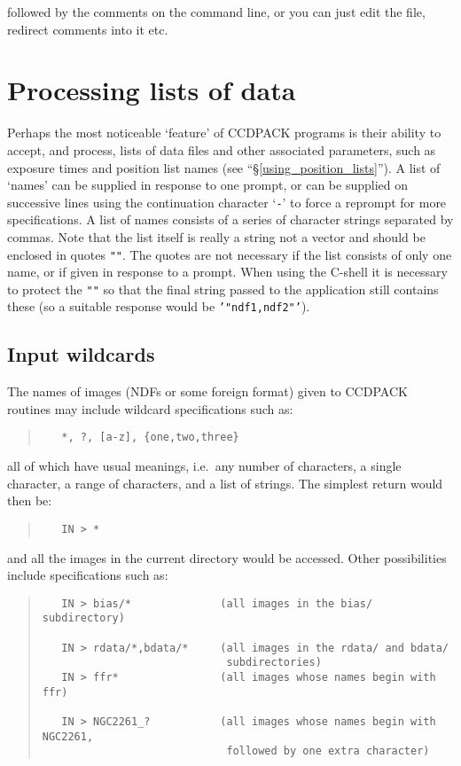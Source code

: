\documentclass[twoside,11pt]{article}
\newcommand{\hyperref}[4]{#2\ref{#4}#3}
\newcommand{\latexhtml}[2]{#1}
\newcommand{\xlabel}[1]{}
\renewcommand{\_}{\texttt{\symbol{95}}}
\newcommand{\ttsize}{\latexhtml{\small}{}}
\newenvironment{myquote}{\begin{quote}\ttsize}{\end{quote}}
\newcommand{\text}[1]{{\ttsize \tt #1}}
\begin{document}
followed by the comments on the command line, or you can just edit the
file, redirect comments into it etc.

\section{Processing lists of data \label{ndflists} \xlabel{ndflists}}

Perhaps the most noticeable `feature' of CCDPACK programs is their ability to
accept, and process, lists of data files and other associated parameters,
such as exposure times and position list names (see
``\hyperref{using position lists}{\S}{}{using_position_lists}'').
A list of `names' can be supplied in
response to one prompt, or can be supplied on successive lines using the
continuation character `\text{-}' to force a reprompt for more
specifications. A list of names consists of a series of character
strings separated by commas. Note that the list itself is really a
string not a vector and should be enclosed in quotes \text{""}.
The quotes are not necessary if the list consists of only one name, or if
given in response to a prompt. When using the C-shell it is necessary to
protect the \text{""} so that the final string passed to the application
still contains these (so a suitable response would be \text{'"ndf1,ndf2"'}).

\subsection{Input wildcards}
The names of images (NDFs or some foreign format) given to CCDPACK
routines may include wildcard specifications such as:
\begin{myquote}
\begin{verbatim}
   *, ?, [a-z], {one,two,three}
\end{verbatim}
\end{myquote}
all of which have usual meanings, i.e.\ any number of characters, 
a single character, a range of characters, and a list of strings.
The simplest return would then be:
\begin{myquote}
\begin{verbatim}
   IN > *
\end{verbatim}
\end{myquote}
and all the images in the current directory would be accessed. Other
possibilities include specifications such as:
\begin{myquote}
\begin{verbatim}
   IN > bias/*              (all images in the bias/ subdirectory)

   IN > rdata/*,bdata/*     (all images in the rdata/ and bdata/
                             subdirectories)
   IN > ffr*                (all images whose names begin with ffr)

   IN > NGC2261_?           (all images whose names begin with NGC2261,
                             followed by one extra character)
\end{verbatim}
\end{myquote}
\end{document}
